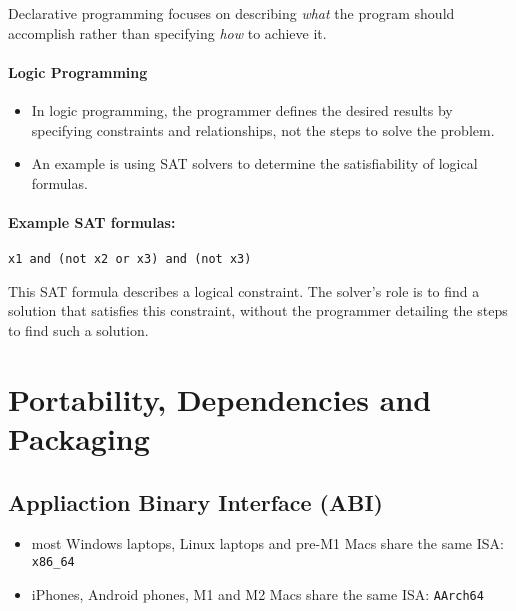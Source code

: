 \documentclass[12pt]{article}
\begin{document}
Declarative programming focuses on describing \textit{what} the program should accomplish rather than specifying \textit{how} to achieve it.

\paragraph{Logic Programming}
\begin{itemize}
    \item In logic programming, the programmer defines the desired results by specifying constraints and relationships, not the steps to solve the problem.
    \item An example is using SAT solvers to determine the satisfiability of logical formulas.
\end{itemize}


\paragraph{Example SAT formulas:}

\begin{verbatim}
x1 and (not x2 or x3) and (not x3)
\end{verbatim}
This SAT formula describes a logical constraint. The solver's role is to find a solution that satisfies this constraint, without the programmer detailing the steps to find such a solution.




















\newpage
\section{Portability, Dependencies and Packaging}

\subsection{Appliaction Binary Interface (ABI)}

\begin{itemize}
    \item most Windows laptops, Linux laptops and pre-M1 Macs share the same ISA: \texttt{x86\_64}
    \item iPhones, Android phones, M1 and M2 Macs share the same ISA: \texttt{AArch64}
\end{itemize}
\end{document}
